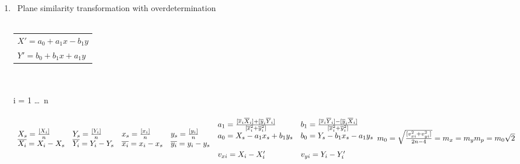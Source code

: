 \documentclass[12pt]{article}
\begin{document}
\begin{enumerate}
\item\ Plane similarity transformation with overdetermination\\
\\
\begin{tabular}{|l|}
\hline
$ X' = a_{0} + a_{1}x - b_{1}y $ \\
$ Y' = b_{0} + b_{1}x + a_{1}y $ \\
\hline
\end{tabular} 
\\
\\
i = 1 \ldots\ n \\
\\ 
$ 
\begin{array}{llll}
X_{s} = \frac{[X_{i}]}{n} &
Y_{s} = \frac{[Y_{i}]}{n} &
x_{s} = \frac{[x_{i}]}{n} &
y_{s} = \frac{[y_{i}]}{n} \\
\overline{X_{i}} = X_{i} - X_{s} &
\overline{Y_{i}} = Y_{i} - Y_{s} &
\overline{x_{i}} = x_{i} - x_{s} &
\overline{y_{i}} = y_{i} - y_{s} \\
\end{array}
\\
\\
\begin{array}{ll}
a_{1} = \frac{[\overline{x}_{i}\overline{X}_{i}] + 
              [\overline{y}_{i}\overline{Y}_{i}]}
             {[\overline{x}_{i}^{2} + 
              \overline{y}_{i}^{2}]} &
b_{1} = \frac{[\overline{x}_{i}\overline{Y}_{i}] - 
              [\overline{y}_{i}\overline{X}_{i}]}
             {[\overline{x}_{i}^{2} + 
              \overline{y}_{i}^{2}]}\\       
a_{0} = X_{s} - a_{1}x_{s} + b_{1}y_{s} &
b_{0} = Y_{s} - b_{1}x_{s} - a_{1}y_{s}\\
\\
v_{xi} = X_{i} - X_{i}' &
v_{yi} = Y_{i} - Y_{i}'\\
\end{array}
\\
m_{0} = \sqrt{\frac{[v_{xi}^{2}+v_{yi}^{2}]}{2n-4}} = m_{x} = m_{y}\\
m_{p} = m_{0}\sqrt{2}\\
\\
$

\end{enumerate}
\end{document}
